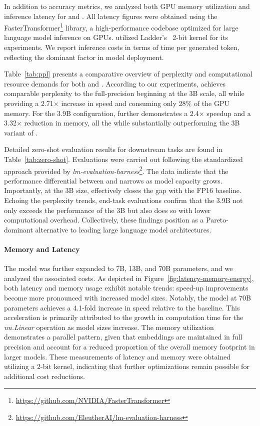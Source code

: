 In addition to accuracy metrics, we analyzed both GPU memory utilization and inference latency for  and . All latency figures were obtained using the FasterTransformer\footnote{\url{https://github.com/NVIDIA/FasterTransformer}} library, a high-performance codebase optimized for large language model inference on GPUs.  utilized Ladder’s~\cite{ladder} 2-bit kernel for its experiments. We report inference costs in terms of time per generated token, reflecting the dominant factor in model deployment.

Table~\ref{tab:ppl} presents a comparative overview of perplexity and computational resource demands for both  and . According to our experiments,  achieves comparable perplexity to the full-precision  beginning at the 3B scale, all while providing a 2.71$\times$ increase in speed and consuming only 28\% of the GPU memory. For the 3.9B configuration,  further demonstrates a 2.4$\times$ speedup and a 3.32$\times$ reduction in memory, all the while substantially outperforming the 3B variant of .

Detailed zero-shot evaluation results for downstream tasks are found in Table~\ref{tab:zero-shot}. Evaluations were carried out following the standardized approach provided by \emph{lm-evaluation-harness}\footnote{\url{https://github.com/EleutherAI/lm-evaluation-harness}}. The data indicate that the performance differential between  and  narrows as model capacity grows. Importantly, at the 3B size,  effectively closes the gap with the FP16 baseline. Echoing the perplexity trends, end-task evaluations confirm that the 3.9B  not only exceeds the performance of the 3B  but also does so with lower computational overhead. Collectively, these findings position  as a Pareto-dominant alternative to leading large language model architectures.

\paragraph{Memory and Latency}

The model was further expanded to 7B, 13B, and 70B parameters, and we analyzed the associated costs. As depicted in Figure~\ref{fig:latency-memory-energy}, both latency and memory usage exhibit notable trends: speed-up improvements become more pronounced with increased model sizes. Notably, the  model at 70B parameters achieves a 4.1-fold increase in speed relative to the  baseline. This acceleration is primarily attributed to the growth in computation time for the \emph{nn.Linear} operation as model sizes increase. The memory utilization demonstrates a parallel pattern, given that embeddings are maintained in full precision and account for a reduced proportion of the overall memory footprint in larger models. These measurements of latency and memory were obtained utilizing a 2-bit kernel, indicating that further optimizations remain possible for additional cost reductions.

